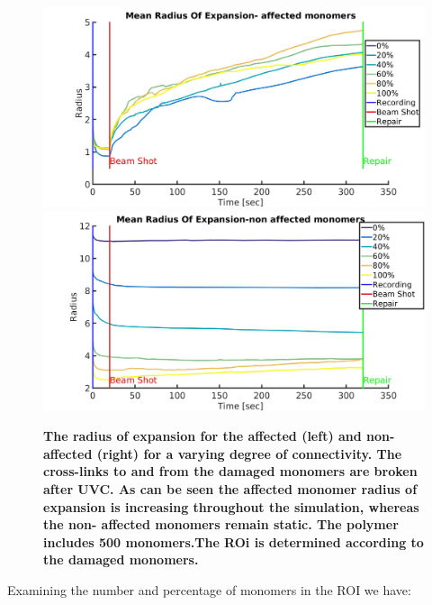 \documentclass[12pt]{report}
\begin{document}
	\begin{figure}[H]
	\includegraphics[width=0.5\linewidth, height=0.3\textheight]{Images/expandAffected/BreakAffectedCrosslinks/meanRadiusOfExpansionAffected}
	\includegraphics[width=0.5\linewidth, height=0.3\textheight]{Images/expandAffected/BreakAffectedCrosslinks/meanRadiusOfExpansionNonAffected}
	\caption{\tiny{\textbf{The radius of expansion for the affected (left) and non-affected (right) for a varying degree of connectivity. The cross-links to and from the damaged monomers are broken after UVC. As can be seen the affected monomer radius of expansion is increasing throughout the simulation, whereas the non- affected monomers remain static.  The polymer includes 500 monomers.The ROi is determined according to the damaged monomers.}}}
	\label{fig:meanRadiusOfExpansionAffectedBrokenCrosslinks}
	\end{figure}
	
	Examining the number and percentage of monomers in the ROI we have:
	
\end{document}
